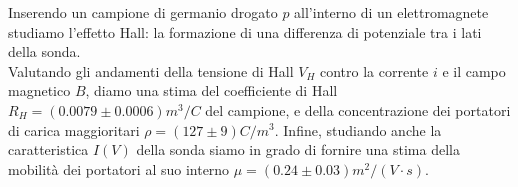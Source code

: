 Inserendo un campione di germanio drogato $ p $ all'interno di un elettromagnete studiamo l'effetto Hall: la formazione di una differenza di potenziale tra i lati della sonda.  \\
Valutando gli andamenti della tensione di Hall $ V_H $ contro la corrente $ i $ e il campo magnetico $ B $, diamo una stima del coefficiente di Hall $ R_H = (0.0079 \pm 0.0006) \unit{m^3 / C} $ del campione, e della concentrazione dei portatori di carica maggioritari $ \rho = (127 \pm 9) \unit{C / m^3} $.
Infine, studiando anche la caratteristica $ I(V) $ della sonda siamo in grado di fornire una stima della mobilità dei portatori al suo interno $ \mu = (0.24 \pm 0.03) \unit{m^2 / (V \cdot s)} $. 
